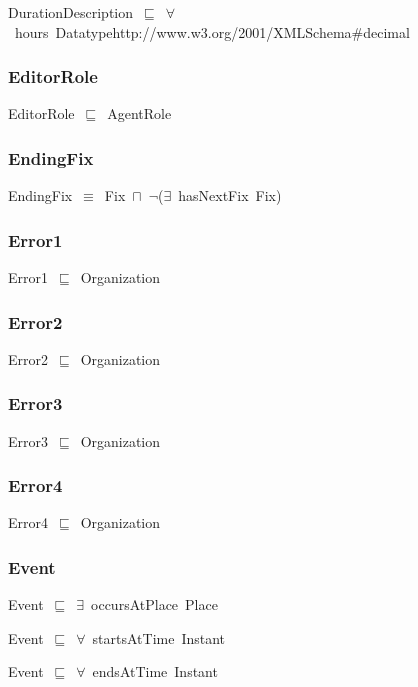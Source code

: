 \documentclass{article}
\begin{document}
DurationDescription~\ensuremath{\sqsubseteq}~\ensuremath{\forall}~hours~Datatypehttp://www.w3.org/2001/XMLSchema#decimal~

\subsubsection*{EditorRole}

EditorRole~\ensuremath{\sqsubseteq}~AgentRole~

\subsubsection*{EndingFix}

EndingFix~\ensuremath{\equiv}~Fix~\ensuremath{\sqcap}~\ensuremath{\lnot}(\ensuremath{\exists}~hasNextFix~Fix)

\subsubsection*{Error1}

Error1~\ensuremath{\sqsubseteq}~Organization~

\subsubsection*{Error2}

Error2~\ensuremath{\sqsubseteq}~Organization~

\subsubsection*{Error3}

Error3~\ensuremath{\sqsubseteq}~Organization~

\subsubsection*{Error4}

Error4~\ensuremath{\sqsubseteq}~Organization~

\subsubsection*{Event}

Event~\ensuremath{\sqsubseteq}~\ensuremath{\exists}~occursAtPlace~Place~

Event~\ensuremath{\sqsubseteq}~\ensuremath{\forall}~startsAtTime~Instant~

Event~\ensuremath{\sqsubseteq}~\ensuremath{\forall}~endsAtTime~Instant~
\end{document}
